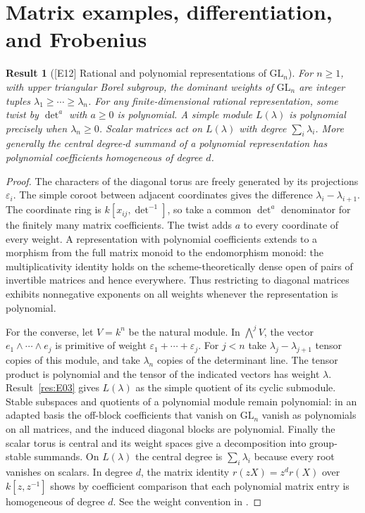 \documentclass[11pt,a4paper,openany,oneside]{book}
\theoremstyle{resultstyle}
\newtheorem{statement}{Result}[chapter]
\newenvironment{result}[2]{\clubpenalty=10000\begin{statement}[\textnormal{[#1]} #2]\leavevmode\label{res:#1}\ignorespaces}{\end{statement}}
\theoremstyle{definition}
\numberwithin{equation}{chapter}
\begin{document}
\section{Matrix examples, differentiation, and Frobenius}

\begin{result}{E12}{Rational and polynomial representations of \(\mathrm{GL}_n\)}
For \(n\geq1\), with upper triangular Borel subgroup, the dominant weights of \(\mathrm{GL}_n\) are integer tuples \(\lambda_1\geq\cdots\geq\lambda_n\). For any finite-dimensional rational representation, some twist by \(\det^a\) with \(a\geq0\) is polynomial. A simple module \(L(\lambda)\) is polynomial precisely when \(\lambda_n\geq0\). Scalar matrices act on \(L(\lambda)\) with degree \(\sum_i\lambda_i\). More generally the central degree-\(d\) summand of a polynomial representation has polynomial coefficients homogeneous of degree \(d\).
\end{result}
\begin{proof}
The characters of the diagonal torus are freely generated by its projections \(\varepsilon_i\). The simple coroot between adjacent coordinates gives the difference \(\lambda_i-\lambda_{i+1}\). The coordinate ring is \(k[x_{ij},\det^{-1}]\), so take a common \(\det^a\) denominator for the finitely many matrix coefficients. The twist adds \(a\) to every coordinate of every weight. A representation with polynomial coefficients extends to a morphism from the full matrix monoid to the endomorphism monoid: the multiplicativity identity holds on the scheme-theoretically dense open of pairs of invertible matrices and hence everywhere. Thus restricting to diagonal matrices exhibits nonnegative exponents on all weights whenever the representation is polynomial.

For the converse, let \(V=k^n\) be the natural module. In \(\bigwedge^j V\), the vector \(e_1\wedge\cdots\wedge e_j\) is primitive of weight \(\varepsilon_1+\cdots+\varepsilon_j\). For \(j<n\) take \(\lambda_j-\lambda_{j+1}\) tensor copies of this module, and take \(\lambda_n\) copies of the determinant line. The tensor product is polynomial and the tensor of the indicated vectors has weight \(\lambda\). Result~\ref{res:E03} gives \(L(\lambda)\) as the simple quotient of its cyclic submodule. Stable subspaces and quotients of a polynomial module remain polynomial: in an adapted basis the off-block coefficients that vanish on \(\mathrm{GL}_n\) vanish as polynomials on all matrices, and the induced diagonal blocks are polynomial. Finally the scalar torus is central and its weight spaces give a decomposition into group-stable summands. On \(L(\lambda)\) the central degree is \(\sum_i\lambda_i\) because every root vanishes on scalars. In degree \(d\), the matrix identity \(r(zX)=z^d r(X)\) over \(k[z,z^{-1}]\) shows by coefficient comparison that each polynomial matrix entry is homogeneous of degree \(d\). See the weight convention in \cite[22.32]{milne}.
\end{proof}
\end{document}
